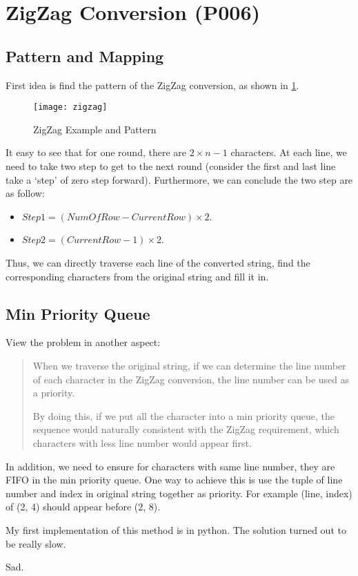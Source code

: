 \documentclass[varwidth]{standalone}
\begin{document}
\section{ZigZag Conversion (P006)}
\subsection{Pattern and Mapping}
First idea is find the pattern of the ZigZag conversion, as shown in
\cref{zigzag}.
\begin{figure}[H]
    \caption{ZigZag Example and Pattern}\label{zigzag}
    \texttt{[image: zigzag]}
\end{figure}

It easy to see that for one round, there are $2 \times n - 1$ characters. At
each line, we need to take two step to get to the next round (consider the
first and last line take a `step' of zero step forward).
Furthermore, we can conclude the two step are as follow:
\begin{itemize}
    \item $Step1 = (NumOfRow - CurrentRow) \times 2$.
    \item $Step2 = (CurrentRow - 1) \times 2$.
\end{itemize}
Thus, we can directly traverse each line of the converted string,
find the corresponding characters from the original string and fill it in.

\subsection{Min Priority Queue}
View the problem in another aspect:
\begin{quote}
    When we traverse the original string, if we can determine the line number of
    each character in the ZigZag conversion, the line number can be used as a
    priority.

    By doing this, if we put all the character into a min priority queue,
    the sequence would naturally consistent with the ZigZag requirement, which
    characters with less line number would appear first.
\end{quote}

In addition, we need to ensure for characters with same line number, they are
FIFO in the min priority queue.
One way to achieve this is use the tuple of line number and index in original
string together as priority. For example (line, index) of (2, 4) should appear
before (2, 8).


My first implementation of this method is in python.
The solution turned out to be really slow.

Sad.
\end{document}
